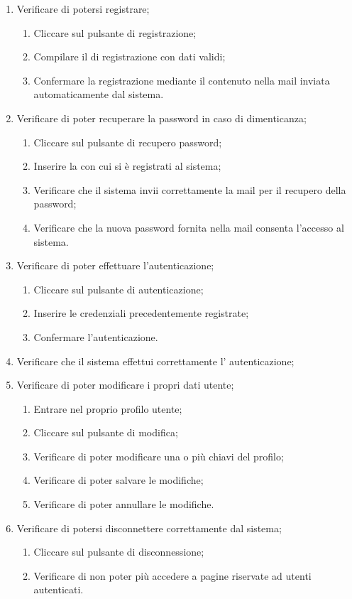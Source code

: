 \begin{enumerate}
\item Verificare di potersi registrare;
\begin{enumerate}
\item Cliccare sul pulsante di registrazione;
\item Compilare il  di registrazione con dati validi;
\item Confermare la registrazione mediante il  contenuto nella mail inviata automaticamente dal sistema.
\end{enumerate}
\item Verificare di poter recuperare la password in caso di dimenticanza;
\begin{enumerate}
\item Cliccare sul pulsante di recupero password;
\item Inserire la  con cui si è registrati al sistema;
\item Verificare che il sistema invii correttamente la mail per il recupero della password;
\item Verificare che la nuova password fornita nella mail consenta l'accesso al sistema.
\end{enumerate}
\item Verificare di poter effettuare l'autenticazione;
\begin{enumerate}
\item Cliccare sul pulsante di autenticazione;
\item Inserire le credenziali precedentemente registrate;
\item Confermare l'autenticazione.
\end{enumerate}
\item Verificare che il sistema effettui correttamente l' autenticazione;
\item Verificare di poter modificare i propri dati utente;
\begin{enumerate}
\item Entrare nel proprio profilo utente;
\item Cliccare sul pulsante di modifica;
\item Verificare di poter modificare una o più chiavi del profilo;
\item Verificare di poter salvare le modifiche;
\item Verificare di poter annullare le modifiche.
\end{enumerate}
\item Verificare di potersi disconnettere correttamente dal sistema;
\begin{enumerate}
\item Cliccare sul pulsante di disconnessione;
\item Verificare di non poter più accedere a pagine riservate ad utenti autenticati.
\end{enumerate}
\end{enumerate}

